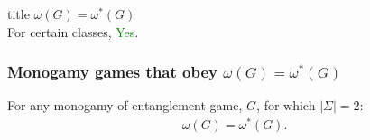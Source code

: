 \documentclass{beamer}
\newcommand{\abs}[1]{\lvert #1 \rvert}
\begin{document}
\begin{frame}[noframenumbering]
  \vfill
  \centering
  \begin{beamercolorbox}[sep=8pt,center,shadow=true,rounded=true]{title}
     $\omega(G) = \omega^*(G)$ \\ For certain classes, \textcolor{green}{Yes}.
  \end{beamercolorbox}
  \vfill
  \end{frame}

\begin{frame}
	\frametitle{Monogamy games that obey $\omega(G) = \omega^*(G)$}
	\begin{theorem}
		For any monogamy-of-entanglement game, $G$, for which $\abs{\Sigma} = 2$:
		\begin{align*}
			\omega(G) = \omega^*(G).
		\end{align*}
	\end{theorem}
\end{frame}
\end{document}

